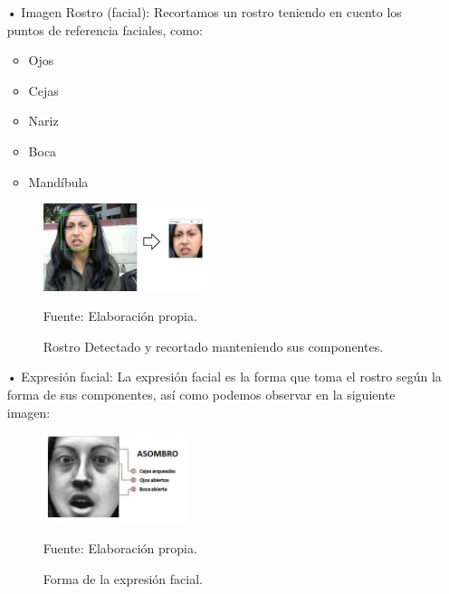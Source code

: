 \vskip 7cm
\begin{itemize}
\item[•] Imagen Rostro (facial): \vskip 0.1cm
Recortamos un rostro teniendo en cuento los puntos de referencia faciales, como:

\begin{itemize}
\item Ojos
\item Cejas
\item Nariz
\item Boca
\item Mandíbula
\end{itemize}

\begin{figure}[ht]
\begin{center}
\includegraphics[width=0.45\textwidth]{Imagen28}
\end{center}
\begin{center}
\vskip -0.5cm
\caption{\small{Rostro Detectado y recortado manteniendo sus componentes.}}
{\small{Fuente: Elaboración propia.}}
\end{center}
\end{figure}

\item[•] Expresión facial: \vskip 0.1cm
La expresión facial es la forma que toma el rostro según la forma de sus componentes, así como podemos observar en la siguiente imagen:

\begin{figure}[ht]
\begin{center}
\includegraphics[width=0.4\textwidth]{Imagen29}
\end{center}
\begin{center}
\vskip -0.5cm
\caption{\small{Forma de la expresión facial.}}
{\small{Fuente: Elaboración propia.}}
\end{center}
\end{figure}


\end{itemize}
